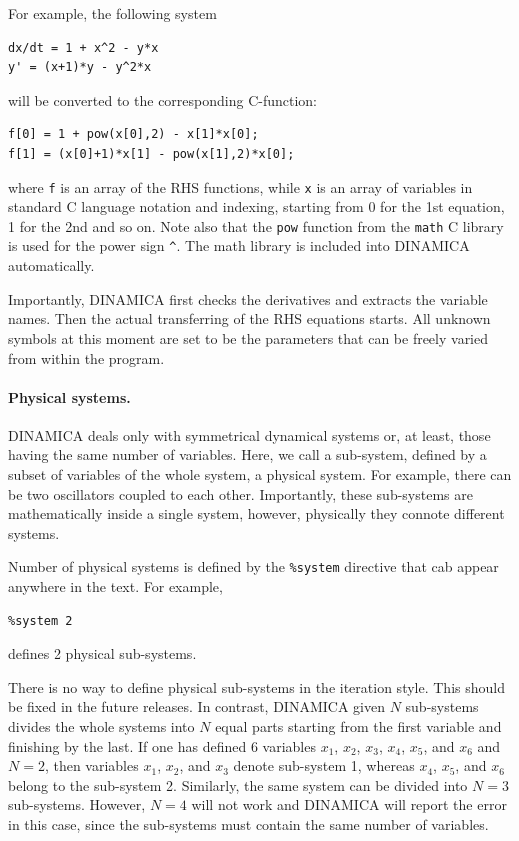 \documentclass[11pt,a4paper]{article}
\begin{document}
For example, the following system
\begin{verbatim}
dx/dt = 1 + x^2 - y*x
y' = (x+1)*y - y^2*x
\end{verbatim}
will be converted to the corresponding C-function:
\begin{verbatim}
f[0] = 1 + pow(x[0],2) - x[1]*x[0];
f[1] = (x[0]+1)*x[1] - pow(x[1],2)*x[0];
\end{verbatim}
where \verb-f- is an array of the RHS functions, while \verb-x- is an array of
variables in standard C language notation and indexing, starting from 0 for the 1st
equation, 1 for the 2nd and so on. Note also that the \verb-pow- function from the
\texttt{math} C library is used for the power sign \verb-^-. The math library is
included into DINAMICA automatically.

Importantly, DINAMICA first checks the derivatives and extracts the variable
names. Then the actual transferring of the RHS equations starts. All unknown
symbols at this moment are set to be the parameters that can be freely varied from
within the program.

\paragraph{Physical systems.}
\label{sec:defin-phys-syst}

DINAMICA deals only with symmetrical dynamical systems or, at least, those having the
same number of variables. Here, we call a sub-system, defined by a subset of variables
of the whole system, a physical system. For example, there can be two oscillators
coupled to each other. Importantly, these sub-systems are mathematically inside a
single system, however, physically they connote different systems.

Number of physical systems is defined by the \verb-%system- directive that cab appear
anywhere in the text. For example,
\begin{verbatim}
%system 2
\end{verbatim}
defines 2 physical sub-systems.

There is no way to define physical sub-systems in the iteration style. This should be
fixed in the future releases. In contrast, DINAMICA given $N$ sub-systems divides the
whole systems into $N$ equal parts starting from the first variable and finishing by
the last. If one has defined 6 variables $x_1$, $x_2$, $x_3$, $x_4$, $x_5$, and
$x_6$ and $N=2$, then variables $x_1$, $x_2$, and $x_3$ denote sub-system 1, whereas
$x_4$, $x_5$, and $x_6$ belong to the sub-system 2. Similarly, the same system can be
divided into $N=3$ sub-systems. However, $N=4$ will not work and DINAMICA will report
the error in this case, since the sub-systems must contain the same number of
variables.
\end{document}
